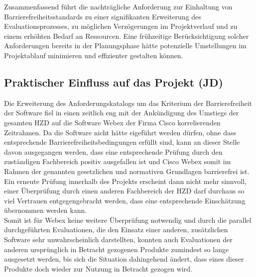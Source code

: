 \documentclass[ThesisDJ.tex]{subfiles}
\begin{document}
Zusammenfassend führt die nachträgliche Anforderung zur Einhaltung von Barrierefreiheitsstandards zu einer signifikanten Erweiterung des Evaluationsprozesses, zu möglichen Verzögerungen im Projektverlauf und zu einem erhöhten Bedarf an Ressourcen. Eine frühzeitige Berücksichtigung solcher Anforderungen bereits in der Planungsphase hätte potenzielle Umstellungen im Projektablauf minimieren und effizienter gestalten können.

\subsection{Praktischer Einfluss auf das Projekt (JD)}
Die Erweiterung des Anforderungskatalogs um das Kriterium der Barrierefreiheit der Software fiel in einen zeitlich eng mit der Ankündigung des Umstiegs der gesamten HZD auf die Software Webex der Firma Cisco korrelierenden Zeitrahmen. Da die Software nicht hätte eigeführt werden dürfen, ohne dass entsprechende Barrierefreiheitsbedingungen erfüllt sind, kann an dieser Stelle davon ausgegangen werden, dass eine entsprechende Prüfung durch den zuständigen Fachbereich positiv ausgefallen ist und Cisco Webex somit im Rahmen der genannten gesetzlichen und normativen Grundlagen barrierefrei ist. Ein erneute Prüfung innerhalb des Projekts erscheint dann nicht mehr sinnvoll, einer Überprüfung durch einen anderen Fachbereich der HZD darf durchaus so viel Vertrauen entgegengebracht werden, dass eine entsprechende Einschätzung übernommen werden kann.\\
Somit ist für Webex keine weitere Überprüfung notwendig und durch die parallel durchgeführten Evaluationen, die den Einsatz einer anderen, zusätzlichen Software sehr unwahrscheinlich darstellten, konnten auch Evaluationen der anderen ursprünglich in Betracht gezogenen Produkte zumindest so lange ausgesetzt werden, bis sich die Situation dahingehend ändert, dass eines dieser Produkte doch wieder zur Nutzung in Betracht gezogen wird.
\end{document}
